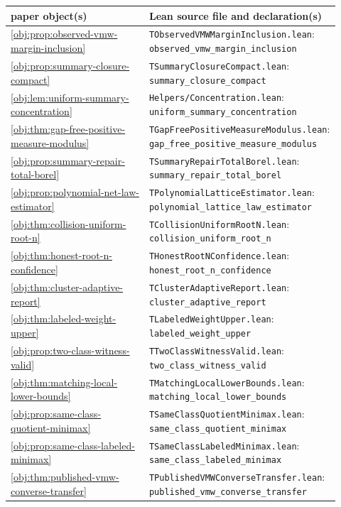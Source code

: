\begin{center}
\scriptsize
\begin{tabular}{p{0.42\linewidth}p{0.5\linewidth}}
paper object(s) & Lean source file and declaration(s)\\
\hline
\cref{obj:prop:observed-vmw-margin-inclusion} & \texttt{TObservedVMWMarginInclusion.lean}: \texttt{observed\_vmw\_margin\_inclusion}\\
\cref{obj:prop:summary-closure-compact} & \texttt{TSummaryClosureCompact.lean}: \texttt{summary\_closure\_compact}\\
\cref{obj:lem:uniform-summary-concentration} & \texttt{Helpers/Concentration.lean}: \texttt{uniform\_summary\_concentration}\\
\cref{obj:thm:gap-free-positive-measure-modulus} & \texttt{TGapFreePositiveMeasureModulus.lean}: \texttt{gap\_free\_positive\_measure\_modulus}\\
\cref{obj:prop:summary-repair-total-borel} & \texttt{TSummaryRepairTotalBorel.lean}: \texttt{summary\_repair\_total\_borel}\\
\cref{obj:prop:polynomial-net-law-estimator} & \texttt{TPolynomialLatticeEstimator.lean}: \texttt{polynomial\_lattice\_law\_estimator}\\
\cref{obj:thm:collision-uniform-root-n} & \texttt{TCollisionUniformRootN.lean}: \texttt{collision\_uniform\_root\_n}\\
\cref{obj:thm:honest-root-n-confidence} & \texttt{THonestRootNConfidence.lean}: \texttt{honest\_root\_n\_confidence}\\
\cref{obj:thm:cluster-adaptive-report} & \texttt{TClusterAdaptiveReport.lean}: \texttt{cluster\_adaptive\_report}\\
\cref{obj:thm:labeled-weight-upper} & \texttt{TLabeledWeightUpper.lean}: \texttt{labeled\_weight\_upper}\\
\cref{obj:prop:two-class-witness-valid} & \texttt{TTwoClassWitnessValid.lean}: \texttt{two\_class\_witness\_valid}\\
\cref{obj:thm:matching-local-lower-bounds} & \texttt{TMatchingLocalLowerBounds.lean}: \texttt{matching\_local\_lower\_bounds}\\
\cref{obj:prop:same-class-quotient-minimax} & \texttt{TSameClassQuotientMinimax.lean}: \texttt{same\_class\_quotient\_minimax}\\
\cref{obj:prop:same-class-labeled-minimax} & \texttt{TSameClassLabeledMinimax.lean}: \texttt{same\_class\_labeled\_minimax}\\
\cref{obj:thm:published-vmw-converse-transfer} & \texttt{TPublishedVMWConverseTransfer.lean}: \texttt{published\_vmw\_converse\_transfer}\\

\end{tabular}
\end{center}
